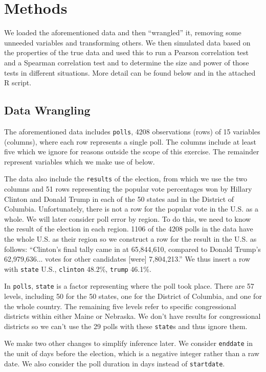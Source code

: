 \documentclass[11pt, oneside]{article}
\newcommand \Rcode[1]{{\texttt{\colorbox{codegray}{#1}}}}
\begin{document}
\section{Methods}

We loaded the aforementioned data and then ``wrangled'' it, removing some unneeded variables and transforming others. We then simulated data based on the properties of the true data and used this to run a Pearson correlation test and a Spearman correlation test and to determine the size and power of those tests in different situations. 
More detail can be found below and in the attached R script. 

\subsection{Data Wrangling}

The aforementioned data includes \Rcode{polls}, 4208 observations (rows) of 15 variables (columns), where each row represents a single poll. The columns include at least five which we ignore for reasons outside the scope of this exercise. The remainder represent variables which we make use of below. 

The data also include the \Rcode{results} of the election, from which we use the two columns and 51 rows representing the popular vote percentages won by Hillary Clinton and Donald Trump in each of the 50 states and in the District of Columbia. Unfortunately, there is not a row for the popular vote in the U.S. as a whole. We will later consider poll error by region. To do this, we need to know the result of the election in each region. 1106 of the 4208 polls in the data have the whole U.S. as their region so we construct a row for the result in the U.S. as follows: ``Clinton's final tally came in at 65,844,610, compared to Donald Trump's 62,979,636... votes for other candidates [were] 7,804,213.'' \cite{time} We thus insert a row with \Rcode{state} U.S., \Rcode{clinton} 48.2\%, \Rcode{trump} 46.1\%.

In \Rcode{polls}, \Rcode{state} is a factor representing where the poll took place. There are 57 levels, including 50 for the 50 states, one for the District of Columbia, and one for the whole country. The remaining five levels refer to specific congressional districts within either Maine or Nebraska. We don't have results for congressional districts so we can't use the 29 polls with these \Rcode{state}s and thus ignore them.

We make two other changes to simplify inference later. We consider \Rcode{enddate} in the unit of days before the election, which is a negative integer rather than a raw date. We also consider the poll duration in days instead of \Rcode{startdate}. 
\end{document}
